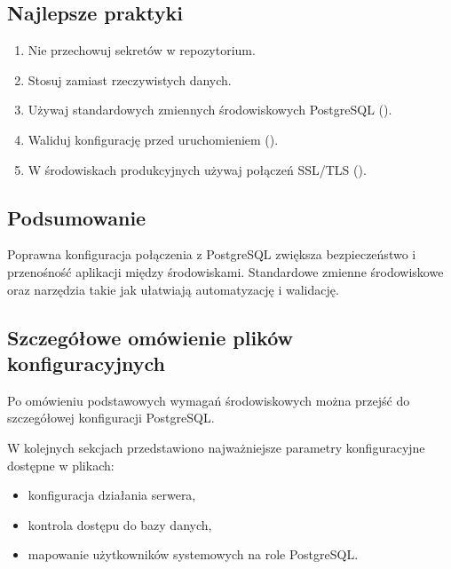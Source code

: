 \documentclass[letterpaper,10pt,english]{sphinxmanual}
\begin{document}
\subsection{Najlepsze praktyki}
\label{\detokenize{rozdzial_2/rozdzial_22/index:najlepsze-praktyki}}\begin{enumerate}
%
\item {} 
\sphinxAtStartPar
Nie przechowuj sekretów w repozytorium.

\item {} 
\sphinxAtStartPar
Stosuj  zamiast rzeczywistych danych.

\item {} 
\sphinxAtStartPar
Używaj standardowych zmiennych środowiskowych PostgreSQL ().

\item {} 
\sphinxAtStartPar
Waliduj konfigurację przed uruchomieniem ().

\item {} 
\sphinxAtStartPar
W środowiskach produkcyjnych używaj połączeń SSL/TLS ().

\end{enumerate}


\subsection{Podsumowanie}
\label{\detokenize{rozdzial_2/rozdzial_22/index:podsumowanie}}
\sphinxAtStartPar
Poprawna konfiguracja połączenia z PostgreSQL zwiększa bezpieczeństwo i przenośność aplikacji między środowiskami. Standardowe zmienne środowiskowe oraz narzędzia takie jak  ułatwiają automatyzację i walidację.


\subsection{Szczegółowe omówienie plików konfiguracyjnych}
\label{\detokenize{rozdzial_2/rozdzial_22/index:szczegolowe-omowienie-plikow-konfiguracyjnych}}
\sphinxAtStartPar
Po omówieniu podstawowych wymagań środowiskowych można przejść do szczegółowej konfiguracji PostgreSQL.

\sphinxAtStartPar
W kolejnych sekcjach przedstawiono najważniejsze parametry konfiguracyjne dostępne w plikach:
\begin{itemize}
\item {} 
\sphinxAtStartPar
{} \textendash{} konfiguracja działania serwera,

\item {} 
\sphinxAtStartPar
{} \textendash{} kontrola dostępu do bazy danych,

\item {} 
\sphinxAtStartPar
{} \textendash{} mapowanie użytkowników systemowych na role PostgreSQL.

\end{itemize}
\end{document}
